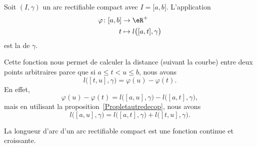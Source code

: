 \begin{definition}
	Soit $(I,\gamma)$ un arc rectifiable compact avec $I=\mathopen[ a , b \mathclose]$. L'application
	\begin{equation}
		\begin{aligned}
			\varphi\colon \mathopen[ a , b \mathclose] & \to \eR^+                                                \\
			t                                          & \mapsto l\big( \mathopen[ a , t \mathclose],\gamma \big)
		\end{aligned}
	\end{equation}
	est la  de $\gamma$.
\end{definition}
Cette fonction nous permet de calculer la distance (suivant la courbe) entre deux points arbitraires parce que si $a\leq t<u\leq b$, nous avons
\begin{equation}
	l\big( [t,u],\gamma \big)=\varphi(u)-\varphi(t).
\end{equation}
En effet,
\begin{equation}
	\varphi(u)-\varphi(t)=l\big( [a,u],\gamma \big)-l\big( [a,t],\gamma \big),
\end{equation}
mais en utilisant la proposition~\ref{Propletautredecop}, nous avons
\begin{equation}
	l\big( [a,u],\gamma \big)=l\big( [a,t],\gamma \big)+l\big( [t,u],\gamma \big).
\end{equation}

\begin{proposition}
	La longueur d'arc d'un arc rectifiable compact est une fonction continue et croissante.
\end{proposition}

